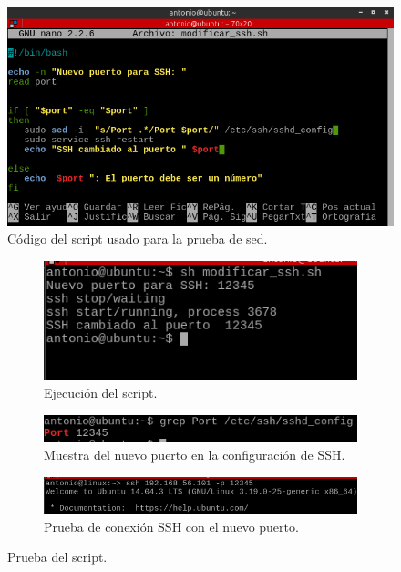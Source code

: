 \begin{figure}[H]
    \begin{center}
        \includegraphics[scale=0.65]{imagenes/img50}
        \caption{Código del script usado para la prueba de sed.}
        \label{fig47}
    \end{center}
\end{figure}


\begin{figure}[H]
    \centering
    \begin{subfigure}[b]{0.72\textwidth}
        \includegraphics[width=\textwidth]{imagenes/img51}
        \caption{Ejecución del script.} 
    \end{subfigure}
   \begin{subfigure}[b]{0.8\textwidth}
        \includegraphics[width=\textwidth]{imagenes/img52}
        \caption{Muestra del nuevo puerto en la configuración de SSH.} 
    \end{subfigure}
    \begin{subfigure}[b]{0.8\textwidth}
        \includegraphics[width=\textwidth]{imagenes/img53}
        \caption{Prueba de conexión SSH con el nuevo puerto.} 
    \end{subfigure}
    \caption{Prueba del script.}  
    \label{fig48} 
\end{figure}
